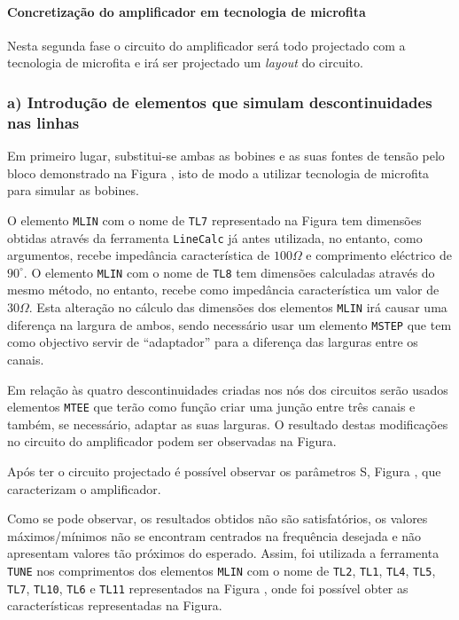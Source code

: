 \documentclass[11pt]{article}
\numberwithin{equation}{section}
\begin{document}
\paragraph{Concretização do amplificador em tecnologia de microfita}

Nesta segunda fase o circuito do amplificador será todo projectado com a tecnologia de microfita e irá ser projectado um \textit{layout} do circuito.

\subsubsection{a) Introdução de elementos que simulam descontinuidades nas linhas}

Em primeiro lugar, substitui-se ambas as bobines e as suas fontes de tensão pelo bloco demonstrado na Figura , isto de modo a utilizar tecnologia de microfita para simular as bobines. 


O elemento \texttt{MLIN} com o nome de \texttt{TL7} representado na Figura  tem dimensões obtidas através da ferramenta \texttt{LineCalc} já antes utilizada, no entanto, como argumentos, recebe impedância característica de $100 \Omega$ e comprimento eléctrico de $90^{\circ}$. O elemento \texttt{MLIN} com o nome de \texttt{TL8} tem dimensões calculadas através do mesmo método, no entanto, recebe como impedância característica um valor de $30 \Omega$. Esta alteração no cálculo das dimensões dos elementos \texttt{MLIN} irá causar uma diferença na largura de ambos, sendo necessário usar um elemento \texttt{MSTEP} que tem como objectivo servir de ``adaptador'' para a diferença das larguras entre os canais.

Em relação às quatro descontinuidades criadas nos nós dos circuitos serão usados elementos \texttt{MTEE} que terão como função criar uma junção entre três canais e também, se necessário, adaptar as suas larguras. O resultado destas modificações no circuito do amplificador podem ser observadas na Figura.

Após ter o circuito projectado é possível observar os parâmetros S, Figura , que caracterizam o amplificador.


Como se pode observar, os resultados obtidos não são satisfatórios, os valores máximos/mínimos não se encontram centrados na frequência desejada e não apresentam valores tão próximos do esperado. Assim, foi utilizada a ferramenta \texttt{TUNE} nos comprimentos dos elementos \texttt{MLIN} com o nome de \texttt{TL2}, \texttt{TL1}, \texttt{TL4}, \texttt{TL5}, \texttt{TL7}, \texttt{TL10}, \texttt{TL6} e \texttt{TL11} representados na Figura , onde foi possível obter as características representadas na Figura.
\end{document}
